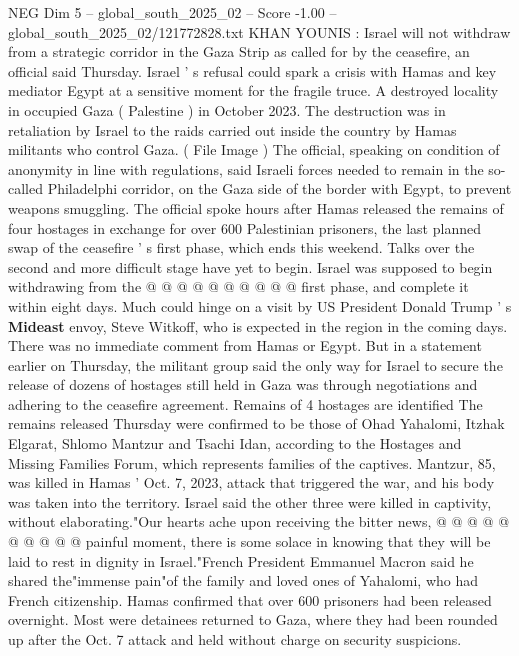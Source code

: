 \begin{textsample}{NEG Dim 5 – global\_south\_2025\_02 – Score -1.00 – global\_south\_2025\_02/121772828.txt}  \label{ex:f5_neg_240}
KHAN YOUNIS : Israel will not withdraw from a strategic corridor in the Gaza Strip as called for by the ceasefire, an official said Thursday.
Israel ' s refusal could spark a crisis with Hamas and key mediator Egypt at a sensitive moment for the fragile truce.
A destroyed locality in occupied Gaza ( Palestine ) in October 2023.
The destruction was in retaliation by Israel to the raids carried out inside the country by Hamas militants who control Gaza. ( File Image ) The official, speaking on condition of anonymity in line with regulations, said Israeli forces needed to remain in the so-called Philadelphi corridor, on the Gaza side of the border with Egypt, to prevent weapons smuggling.
The official spoke hours after Hamas released the remains of four hostages in exchange for over 600 Palestinian prisoners, the last planned swap of the ceasefire ' s first phase, which ends this weekend.
Talks over the second and more difficult stage have yet to begin.
Israel was supposed to begin withdrawing from the @ @ @ @ @ @ @ @ @ @ first phase, and complete it within eight days.
Much could hinge on a visit by US President Donald Trump ' s \textbf{Mideast} envoy, Steve Witkoff, who is expected in the region in the coming days.
There was no immediate comment from Hamas or Egypt.
But in a statement earlier on Thursday, the militant group said the only way for Israel to secure the release of dozens of hostages still held in Gaza was through negotiations and adhering to the ceasefire agreement.
Remains of 4 hostages are identified The remains released Thursday were confirmed to be those of Ohad Yahalomi, Itzhak Elgarat, Shlomo Mantzur and Tsachi Idan, according to the Hostages and Missing Families Forum, which represents families of the captives.
Mantzur, 85, was killed in Hamas ' Oct. 7, 2023, attack that triggered the war, and his body was taken into the territory.
Israel said the other three were killed in captivity, without elaborating."Our hearts ache upon receiving the bitter news, @ @ @ @ @ @ @ @ @ @ painful moment, there is some solace in knowing that they will be laid to rest in dignity in Israel."French President Emmanuel Macron said he shared the"immense pain"of the family and loved ones of Yahalomi, who had French citizenship.
Hamas confirmed that over 600 prisoners had been released overnight.
Most were detainees returned to Gaza, where they had been rounded up after the Oct. 7 attack and held without charge on security suspicions.

\end{textsample}
